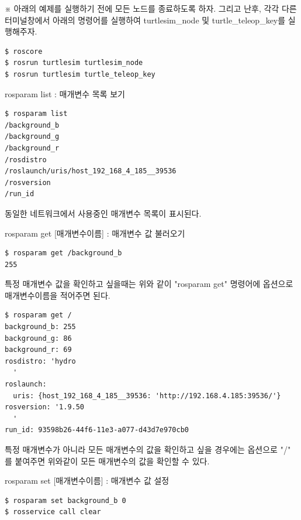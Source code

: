 \vspace{\baselineskip}
\noindent
※ 아래의 예제를 실행하기 전에 모든 노드를 종료하도록 하자. 그리고 난후, 각각 다른 터미널창에서 아래의 명령어를 실행하여 turtlesim\_node 및 turtle\_teleop\_key를 실행해주자.

\begin{lstlisting}[language=ROS]
$ roscore
$ rosrun turtlesim turtlesim_node 
$ rosrun turtlesim turtle_teleop_key
\end{lstlisting}

\setcounter{num}{0}

\noindent
{}\circled{\thenum} rosparam list : 매개변수 목록 보기

\begin{lstlisting}[language=ROS]
$ rosparam list
/background_b
/background_g
/background_r
/rosdistro
/roslaunch/uris/host_192_168_4_185__39536
/rosversion
/run_id
\end{lstlisting}

\noindent
동일한 네트워크에서 사용중인 매개변수 목록이 표시된다.

\vspace{\baselineskip}
\noindent
{}\circled{\thenum} rosparam get [매개변수이름] : 매개변수 값 불러오기

\begin{lstlisting}[language=ROS]
$ rosparam get /background_b
255
\end{lstlisting}

\noindent
특정 매개변수 값을 확인하고 싶을때는 위와 같이 "rosparam get" 명령어에 옵션으로 매개변수이름을 적어주면 된다.

\begin{lstlisting}[language=ROS]
$ rosparam get /
background_b: 255
background_g: 86
background_r: 69
rosdistro: 'hydro
  '
roslaunch:
  uris: {host_192_168_4_185__39536: 'http://192.168.4.185:39536/'}
rosversion: '1.9.50
  '
run_id: 93598b26-44f6-11e3-a077-d43d7e970cb0
\end{lstlisting}

\noindent
특정 매개변수가 아니라 모든 매개변수의 값을 확인하고 싶을 경우에는 옵션으로 "/" 를 붙여주면 위와같이 모든 매개변수의 값을 확인할 수 있다.

\vspace{\baselineskip}
\noindent
{}\circled{\thenum} rosparam set [매개변수이름] : 매개변수 값 설정 

\begin{lstlisting}[language=ROS]
$ rosparam set background_b 0
$ rosservice call clear
\end{lstlisting}

